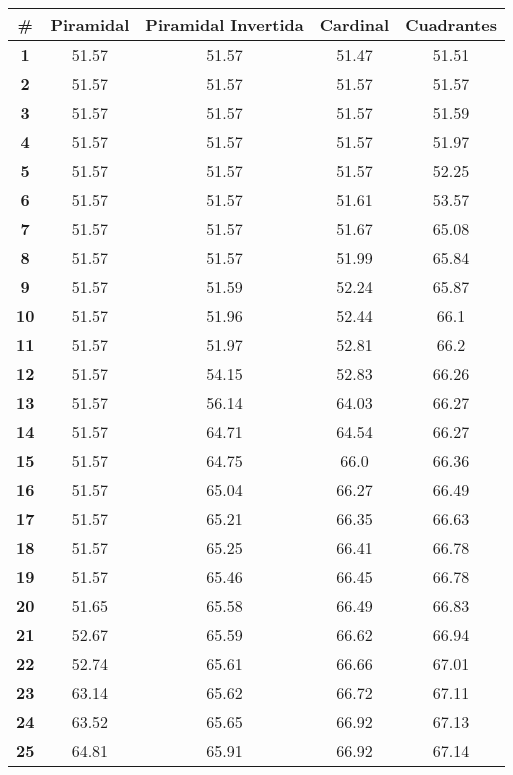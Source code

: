 \begin{longtable}{|c|c|c|c|c|}
    \hline
    \rowcolor[HTML]{ECF4FF} 
    \textbf{\#} & \textbf{Piramidal} & \textbf{Piramidal Invertida} & \textbf{Cardinal} & \textbf{Cuadrantes} \\ \hline
    \endhead
    \textbf{1} & 51.57 & 51.57 & 51.47 & 51.51 \\ \hline 
\textbf{2} & 51.57 & 51.57 & 51.57 & 51.57 \\ \hline 
\textbf{3} & 51.57 & 51.57 & 51.57 & 51.59 \\ \hline 
\textbf{4} & 51.57 & 51.57 & 51.57 & 51.97 \\ \hline 
\textbf{5} & 51.57 & 51.57 & 51.57 & 52.25 \\ \hline 
\textbf{6} & 51.57 & 51.57 & 51.61 & 53.57 \\ \hline 
\textbf{7} & 51.57 & 51.57 & 51.67 & 65.08 \\ \hline 
\textbf{8} & 51.57 & 51.57 & 51.99 & 65.84 \\ \hline 
\textbf{9} & 51.57 & 51.59 & 52.24 & 65.87 \\ \hline 
\textbf{10} & 51.57 & 51.96 & 52.44 & 66.1 \\ \hline 
\textbf{11} & 51.57 & 51.97 & 52.81 & 66.2 \\ \hline 
\textbf{12} & 51.57 & 54.15 & 52.83 & 66.26 \\ \hline 
\textbf{13} & 51.57 & 56.14 & 64.03 & 66.27 \\ \hline 
\textbf{14} & 51.57 & 64.71 & 64.54 & 66.27 \\ \hline 
\textbf{15} & 51.57 & 64.75 & 66.0 & 66.36 \\ \hline 
\textbf{16} & 51.57 & 65.04 & 66.27 & 66.49 \\ \hline 
\textbf{17} & 51.57 & 65.21 & 66.35 & 66.63 \\ \hline 
\textbf{18} & 51.57 & 65.25 & 66.41 & 66.78 \\ \hline 
\textbf{19} & 51.57 & 65.46 & 66.45 & 66.78 \\ \hline 
\textbf{20} & 51.65 & 65.58 & 66.49 & 66.83 \\ \hline 
\textbf{21} & 52.67 & 65.59 & 66.62 & 66.94 \\ \hline 
\textbf{22} & 52.74 & 65.61 & 66.66 & 67.01 \\ \hline 
\textbf{23} & 63.14 & 65.62 & 66.72 & 67.11 \\ \hline 
\textbf{24} & 63.52 & 65.65 & 66.92 & 67.13 \\ \hline 
\textbf{25} & 64.81 & 65.91 & 66.92 & 67.14 \\ \hline 

\end{longtable}
